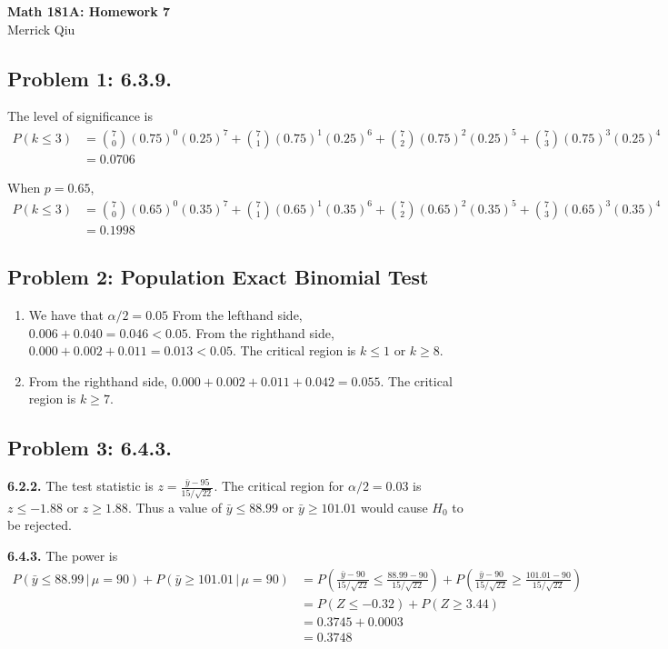 \documentclass{article}
\begin{document}
\begin{center}
	\huge{\bf Math 181A: Homework 7} \\
	Merrick Qiu 
\end{center}

\subsection*{Problem 1: 6.3.9.}
The level of significance is 
\begin{align*}
	P(k \leq 3) &=
	\binom{7}{0} (0.75)^0(0.25)^7 +
	\binom{7}{1} (0.75)^1(0.25)^6 +
	\binom{7}{2} (0.75)^2(0.25)^5 +
	\binom{7}{3} (0.75)^3(0.25)^4 \\
	&= 0.0706
\end{align*}
	

When $p=0.65$, 
\begin{align*}
	P(k \leq 3) &=
	\binom{7}{0} (0.65)^0(0.35)^7 +
	\binom{7}{1} (0.65)^1(0.35)^6 +
	\binom{7}{2} (0.65)^2(0.35)^5 +
	\binom{7}{3} (0.65)^3(0.35)^4 \\
	&= 0.1998
\end{align*}
\newpage 

\subsection*{Problem 2: Population Exact Binomial Test}
\begin{enumerate}
	\item We have that $\alpha/2 = 0.05$ 
	From the lefthand side, $0.006 + 0.040 = 0.046 < 0.05$.
	From the righthand side, $0.000 + 0.002 + 0.011 = 0.013 < 0.05$.
	The critical region is $k \leq 1$ or $k \geq 8$.
	\item From the righthand side, $0.000 + 0.002 + 0.011 + 0.042 = 0.055$.
	The critical region is $k \geq 7$.
\end{enumerate}
\newpage

\subsection*{Problem 3: 6.4.3.}
\textbf{6.2.2.}
The test statistic is $z = \frac{\bar{y}-95}{15/\sqrt{22}}$.
The critical region for $\alpha/2 = 0.03$ is $z \leq -1.88$ or $z \geq 1.88$.
Thus a value of $\bar{y} \leq 88.99$ or $\bar{y} \geq 101.01$ would cause
$H_0$ to be rejected.

\textbf{6.4.3.}
The power is 
\begin{align*}
	P(\bar{y} \leq 88.99 \,|\, \mu = 90) + P(\bar{y} \geq 101.01 \,|\, \mu = 90)
	&= P(\frac{\bar{y}-90}{15/\sqrt{22}} \leq \frac{88.99-90}{15/\sqrt{22}}) +
	P(\frac{\bar{y}-90}{15/\sqrt{22}} \geq \frac{101.01-90}{15/\sqrt{22}}) \\
	&= P(Z \leq -0.32) + P(Z \geq 3.44) \\
	&= 0.3745 + 0.0003 \\
	&= 0.3748
\end{align*}
\newpage 
\end{document}
